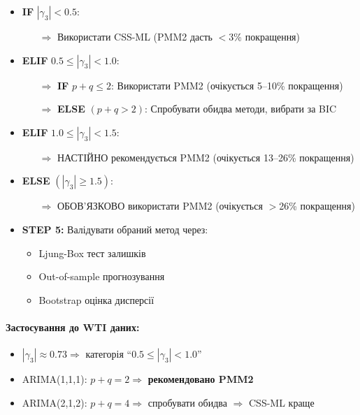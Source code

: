 \begin{itemize}
    \item \textbf{IF} $|\gamma_3| < 0.5$:
    \begin{itemize}
        \item[$\Rightarrow$] Використати CSS-ML (PMM2 дасть $<$3\% покращення)
    \end{itemize}

    \item \textbf{ELIF} $0.5 \leq |\gamma_3| < 1.0$:
    \begin{itemize}
        \item[$\Rightarrow$] \textbf{IF} $p+q \leq 2$: Використати PMM2 (очікується 5--10\% покращення)
        \item[$\Rightarrow$] \textbf{ELSE} $(p+q > 2)$: Спробувати обидва методи, вибрати за BIC
    \end{itemize}

    \item \textbf{ELIF} $1.0 \leq |\gamma_3| < 1.5$:
    \begin{itemize}
        \item[$\Rightarrow$] НАСТІЙНО рекомендується PMM2 (очікується 13--26\% покращення)
    \end{itemize}

    \item \textbf{ELSE} $(|\gamma_3| \geq 1.5)$:
    \begin{itemize}
        \item[$\Rightarrow$] ОБОВ'ЯЗКОВО використати PMM2 (очікується $>$26\% покращення)
    \end{itemize}

    \item \textbf{STEP 5:} Валідувати обраний метод через:
    \begin{itemize}
        \item Ljung-Box тест залишків
        \item Out-of-sample прогнозування
        \item Bootstrap оцінка дисперсії
    \end{itemize}
\end{itemize}

\paragraph{Застосування до WTI даних:}
\begin{itemize}
    \item $|\gamma_3| \approx 0.73 \Rightarrow$ категорія ``$0.5 \leq |\gamma_3| < 1.0$''
    \item ARIMA(1,1,1): $p+q = 2 \Rightarrow$ \textbf{рекомендовано PMM2} \checkmark
    \item ARIMA(2,1,2): $p+q = 4 \Rightarrow$ спробувати обидва $\Rightarrow$ CSS-ML краще \checkmark
\end{itemize}

